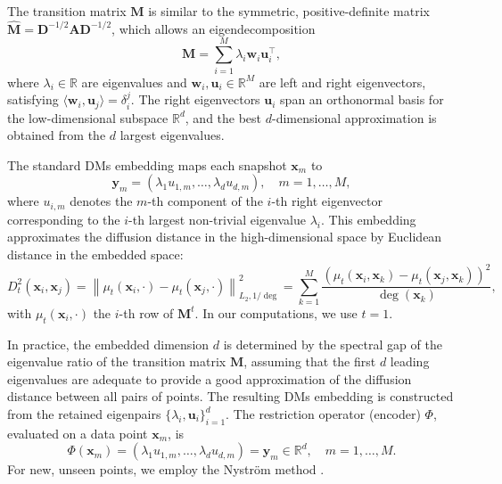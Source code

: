 \documentclass{article}
\begin{document}
The transition matrix $\mathbf{M}$ is similar to the symmetric, positive-definite matrix $\hat{\mathbf{M}} = \mathbf{D}^{-1/2} \mathbf{A} \mathbf{D}^{-1/2}$, which allows an eigendecomposition
\begin{equation}
	\mathbf{M} = \sum_{i=1}^{M} \lambda_i \mathbf{w}_i \mathbf{u}_i^\top,
\end{equation}
where $\lambda_i \in \mathbb{R}$ are eigenvalues and $\mathbf{w}_i, \mathbf{u}_i \in \mathbb{R}^M$ are left and right eigenvectors, satisfying $\langle \mathbf{w}_i, \mathbf{u}_j \rangle = \delta_i^j$. The right eigenvectors $\mathbf{u}_i$ span an orthonormal basis for the low-dimensional subspace $\mathbb{R}^d$, and the best $d$-dimensional approximation is obtained from the $d$ largest eigenvalues.

The standard DMs embedding maps each snapshot $\boldsymbol{x}_m$ to
\begin{equation}
	\mathbf{y}_m = (\lambda_1 u_{1,m}, \ldots, \lambda_d u_{d,m}), \quad m = 1, \ldots, M,
\end{equation}
where $u_{i,m}$ denotes the $m$-th component of the $i$-th right eigenvector corresponding to the $i$-th largest non-trivial eigenvalue $\lambda_i$. This embedding approximates the diffusion distance in the high-dimensional space by Euclidean distance in the embedded space:
\begin{equation}
	D_t^2(\boldsymbol{x}_i, \boldsymbol{x}_j) = \left\| \mu_t(\boldsymbol{x}_i, \cdot) - \mu_t(\boldsymbol{x}_j, \cdot) \right\|_{L_2, 1/\operatorname{deg}}^2 = \sum_{k=1}^{M} \frac{\left(\mu_t(\boldsymbol{x}_i, \boldsymbol{x}_k) - \mu_t(\boldsymbol{x}_j, \boldsymbol{x}_k)\right)^2}{\operatorname{deg}(\boldsymbol{x}_k)},
\end{equation}
with $\mu_t(\mathbf{x}_i, \cdot)$ the $i$-th row of $\mathbf{M}^t$. In our computations, we use $t = 1$.

In practice, the embedded dimension $d$ is determined by the
spectral gap of the eigenvalue ratio of the transition matrix $\textbf{M}$,
assuming that the first $d$ leading eigenvalues are adequate to provide a good approximation of the diffusion distance between all pairs of points.
The resulting DMs embedding is constructed from the retained eigenpairs $\{\lambda_i, \mathbf{u}_i\}_{i=1}^d$. The restriction operator (encoder) $\varPhi$, evaluated on a data point $\mathbf{x}_m$, is
\begin{equation}
	\varPhi(\mathbf{x}_m) = (\lambda_1 u_{1,m}, \ldots, \lambda_d u_{d,m}) = \mathbf{y}_m \in \mathbb{R}^d, \quad m = 1, \ldots, M.
\end{equation}
For new, unseen points, we employ the Nyström method \cite{nystrom1929uber,coifman2006geometric,chiavazzo2014reduced,evangelou2022double,Patsatzis_2023}.
\end{document}
